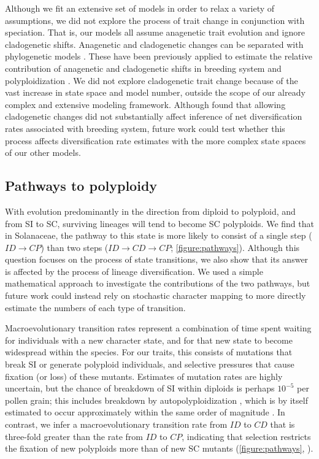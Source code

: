 Although we fit an extensive set of models in order to relax a variety of assumptions, we did not explore the process of trait change in conjunction with speciation.
That is, our models all assume anagenetic trait evolution and ignore cladogenetic shifts.
Anagenetic and cladogenetic changes can be separated with phylogenetic models \citep{mayrose_2011, goldberg_2012, magnuson-ford_2012}. 
These have been previously applied to estimate the relative contribution of anagenetic and cladogenetic shifts in breeding system \citep{goldberg_2012} and polyploidization \citep{zhan_2016, freyman_2017}.
We did not explore cladogenetic trait change because of the vast increase in state space and model number, outside the scope of our already complex and extensive modeling framework. 
Although \citet{goldberg_2012} found that allowing cladogenetic changes did not substantially affect inference of net diversification rates associated with breeding system, future work could test whether this process affects diversification rate estimates with the more complex state spaces of our other models.

\subsection{Pathways to polyploidy}

With evolution predominantly in the direction from diploid to polyploid, and from SI to SC, surviving lineages will tend to become SC polyploids.
We find that in Solanaceae, the pathway to this state is more likely to consist of a single step ($ID \rightarrow CP$) than two steps ($ID \rightarrow CD \rightarrow CP$; \cref{figure:pathways}).
Although this question focuses on the process of state transitions, we also show that its answer is affected by the process of lineage diversification.
We used a simple mathematical approach to investigate the contributions of the two pathways, but future work could instead rely on stochastic character mapping to more directly estimate the numbers of each type of transition.

Macroevolutionary transition rates represent a combination of time spent waiting for individuals with a new character state, and for that new state to become widespread within the species.
For our traits, this consists of mutations that break SI or generate polyploid individuals, and selective pressures that cause fixation (or loss) of these mutants.
Estimates of mutation rates are highly uncertain, but the chance of breakdown of SI within diploids is perhaps $10^{-5}$ per pollen grain; this includes breakdown by autopolyploidization \citep{lewis1979}, which is by itself estimated to occur approximately within the same order of magnitude \citep{ramsey_1998}. 
In contrast, we infer a macroevolutionary transition rate from $ID$ to $CD$ that is three-fold greater than the rate from $ID$ to $CP$, indicating that selection restricts the fixation of new polyploids more than of new SC mutants  (\cref{figure:pathways}, \citealt{robertson_2011}). %

